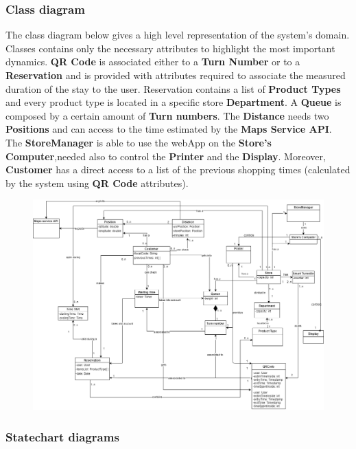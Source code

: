 \documentclass{article}
\begin{document}
\subsubsection{Class diagram}
The class diagram below gives a high level representation of the system's domain. Classes contains only the necessary attributes to highlight the most important dynamics. \textbf{QR Code} is associated either to a \textbf{Turn Number} or to a \textbf{Reservation} and is provided with attributes required to associate the measured duration of the stay to the user. Reservation contains a list of \textbf{Product Types} and every product type is located in a specific store \textbf{Department}. A \textbf{Queue} is composed by a certain amount of \textbf{Turn numbers}. The \textbf{Distance} needs two \textbf{Positions} and can access to the time estimated by the \textbf{Maps Service API}. The \textbf{StoreManager} is able to use the webApp on the \textbf{Store's Computer},needed also to control the \textbf{Printer} and the \textbf{Display}. Moreover, \textbf{Customer} has a direct access to a list of the previous shopping times (calculated by the system using \textbf{QR Code} attributes).\newline\newline\newline\newline
\begin{figure}[H]
  \includegraphics[width=\linewidth]{class_diagram.png}
  
\end{figure}

\newpage
\subsubsection{Statechart diagrams}
\end{document}
